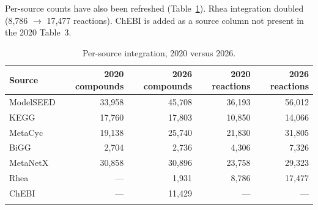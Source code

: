 Per-source counts have also been refreshed (Table~\ref{tab:persource}). Rhea
integration doubled (8,786 $\rightarrow$ 17,477 reactions). ChEBI is added as a
source column not present in the 2020 Table~3.

\begin{table}[!t]
\caption{Per-source integration, 2020 versus 2026.\label{tab:persource}}%
\begin{tabular*}{\textwidth}{@{\extracolsep\fill}lrrrr@{\extracolsep\fill}}
\toprule
Source & 2020 compounds & 2026 compounds & 2020 reactions & 2026 reactions \\
\midrule
ModelSEED & 33,958 & 45,708 & 36,193 & 56,012 \\
KEGG      & 17,760 & 17,803 & 10,850 & 14,066 \\
MetaCyc   & 19,138 & 25,740 & 21,830 & 31,805 \\
BiGG      &  2,704 &  2,736 &  4,306 &  7,326 \\
MetaNetX  & 30,858 & 30,896 & 23,758 & 29,323 \\
Rhea      & ---    &  1,931 &  8,786 & 17,477 \\
ChEBI     & ---    & 11,429 & ---    & ---    \\
\botrule
\end{tabular*}
\end{table}
